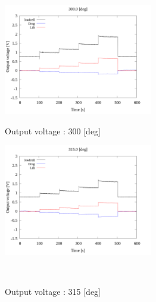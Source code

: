 \begin{figure}[htbp]
      \begin{minipage}[b]{0.45\linewidth}
        \centering
        \includegraphics[width=65mm]{../../02_workspace/result/2-1/plot/01-3_allsensors/01_allsensors_3000.png}
        \caption{Output voltage : 300 [deg]}
      \end{minipage}
      \begin{minipage}[b]{0.45\linewidth}
        \centering
        \includegraphics[width=65mm]{../../02_workspace/result/2-1/plot/01-3_allsensors/01_allsensors_3150.png}
        \caption{Output voltage : 315 [deg]}
      \end{minipage}\\


\end{figure}
